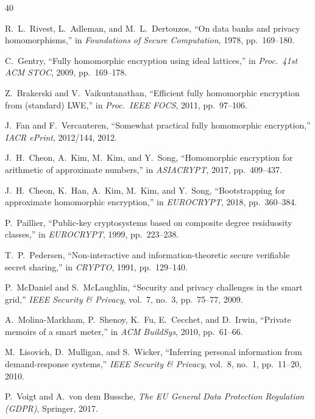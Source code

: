 \begin{thebibliography}{40}

R.~L.~Rivest, L.~Adleman, and M.~L.~Dertouzos, ``On data banks and privacy homomorphisms,'' in \emph{Foundations of Secure Computation}, 1978, pp.~169--180.

C.~Gentry, ``Fully homomorphic encryption using ideal lattices,'' in \emph{Proc.\ 41st ACM STOC}, 2009, pp.~169--178.

Z.~Brakerski and V.~Vaikuntanathan, ``Efficient fully homomorphic encryption from (standard) LWE,'' in \emph{Proc.\ IEEE FOCS}, 2011, pp.~97--106.

J.~Fan and F.~Vercauteren, ``Somewhat practical fully homomorphic encryption,'' \emph{IACR ePrint}, 2012/144, 2012.

J.~H.~Cheon, A.~Kim, M.~Kim, and Y.~Song, ``Homomorphic encryption for arithmetic of approximate numbers,'' in \emph{ASIACRYPT}, 2017, pp.~409--437.

J.~H.~Cheon, K.~Han, A.~Kim, M.~Kim, and Y.~Song, ``Bootstrapping for approximate homomorphic encryption,'' in \emph{EUROCRYPT}, 2018, pp.~360--384.

P.~Paillier, ``Public-key cryptosystems based on composite degree residuosity classes,'' in \emph{EUROCRYPT}, 1999, pp.~223--238.

T.~P.~Pedersen, ``Non-interactive and information-theoretic secure verifiable secret sharing,'' in \emph{CRYPTO}, 1991, pp.~129--140.

P.~McDaniel and S.~McLaughlin, ``Security and privacy challenges in the smart grid,'' \emph{IEEE Security \& Privacy}, vol.~7, no.~3, pp.~75--77, 2009.

A.~Molina-Markham, P.~Shenoy, K.~Fu, E.~Cecchet, and D.~Irwin, ``Private memoirs of a smart meter,'' in \emph{ACM BuildSys}, 2010, pp.~61--66.

M.~Lisovich, D.~Mulligan, and S.~Wicker, ``Inferring personal information from demand-response systems,'' \emph{IEEE Security \& Privacy}, vol.~8, no.~1, pp.~11--20, 2010.

P.~Voigt and A.~von dem Bussche, \emph{The EU General Data Protection Regulation (GDPR)}, Springer, 2017.


\end{thebibliography}
